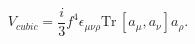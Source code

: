 \begin{equation}
V_{cubic} =  \frac{i}{3} f^4 \epsilon_{\mu \nu \rho} \textrm{Tr} \,
[ a_{\mu},a_{\nu} ]
a_{\rho} .
\end{equation}

